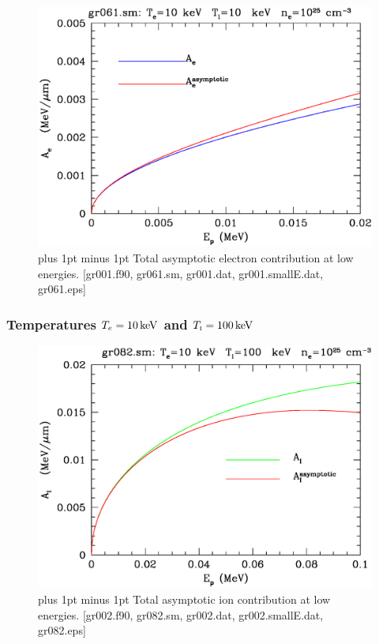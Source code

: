 \documentclass[preprint,12pt,eqsecnum,nofootinbib,amsmath,amssymb]{revtex4}
\newcommand{\smI}{{\rm\scriptscriptstyle I}}
\newcommand{\footnoteskip}{\baselineskip 12pt plus 1pt minus 1pt}
\begin{document}
\vskip-2cm 
\begin{figure}[h!]
\includegraphics[scale=0.45]{gr061.eps} 
\vskip-0.8cm 
\caption{\footnoteskip  
  Total asymptotic electron contribution at low energies. 
 [gr001.f90, gr061.sm, gr001.dat, gr001.smallE.dat, gr061.eps] 
}
\label{fig:gr061}
\end{figure}


\pagebreak
\subsubsection{Temperatures $T_e=10\,{\rm keV}$ and $T_\smI=100\,{\rm keV}$}

\vskip-2cm 
\begin{figure}[h!]
\includegraphics[scale=0.45]{gr082.eps} 
\vskip-0.8cm 
\caption{\footnoteskip  
  Total asymptotic ion contribution at low energies. 
 [gr002.f90, gr082.sm, gr002.dat, gr002.smallE.dat, gr082.eps] 
}
\label{fig:gr082}
\end{figure}
\end{document}
